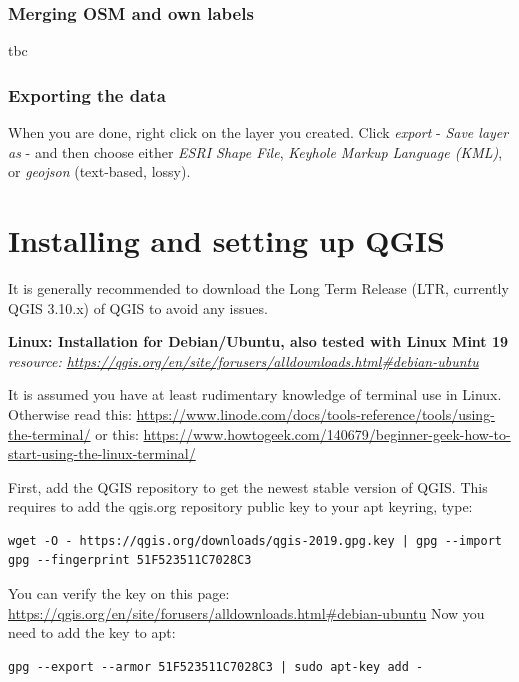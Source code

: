 \documentclass[12pt,a4paper]{scrartcl}
\begin{document}
\subsubsection{Merging OSM and own labels}
tbc

\subsubsection{Exporting the data}
When you are done, right click on the layer you created. Click  \textit{export} - \textit{Save layer as} - and then choose either \textit{ESRI Shape File}, \textit{Keyhole Markup Language (KML)}, or \textit{geojson} (text-based, lossy).


\section{Installing and setting up QGIS}
\label{sec:qgis_install}
It is generally recommended to download the Long Term Release (LTR, currently QGIS 3.10.x) of QGIS to avoid any issues. \newline

\textbf{Linux: Installation for Debian/Ubuntu, also tested with Linux Mint 19} \newline
\textit{resource: \url{https://qgis.org/en/site/forusers/alldownloads.html\#debian-ubuntu}} \newline 

It is assumed you have at least rudimentary knowledge of terminal use in Linux. \newline
Otherwise read this: 
\url{https://www.linode.com/docs/tools-reference/tools/using-the-terminal/} \newline
or this: 
\url{https://www.howtogeek.com/140679/beginner-geek-how-to-start-using-the-linux-terminal/} \newline

First, add the QGIS repository to get the newest stable version of QGIS.
This requires to add the qgis.org repository public key to your apt keyring, type:

\begin{verbatim}
wget -O - https://qgis.org/downloads/qgis-2019.gpg.key | gpg --import
gpg --fingerprint 51F523511C7028C3
\end{verbatim}

You can verify the key on this page: \url{https://qgis.org/en/site/forusers/alldownloads.html\#debian-ubuntu}
Now you need to add the key to apt:  

\begin{verbatim}
gpg --export --armor 51F523511C7028C3 | sudo apt-key add -
\end{verbatim}
\end{document}
